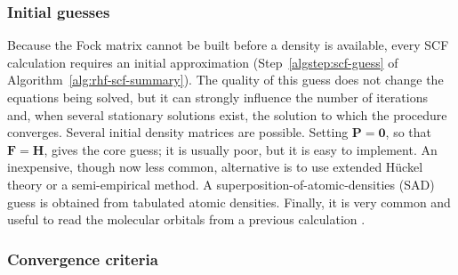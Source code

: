 \documentclass[11pt,a4paper,titlepage]{article}
\numberwithin{equation}{section}
\newcommand{\bF}{\boldsymbol{F}}
\newcommand{\bH}{\boldsymbol{H}}
\newcommand{\bO}{\boldsymbol{0}}
\newcommand{\bP}{\boldsymbol{P}}
\begin{document}
\subsubsection{Initial guesses}

Because the Fock matrix cannot be built before a density is available, every
SCF calculation requires an initial approximation
(Step~\ref{algstep:scf-guess} of Algorithm~\ref{alg:rhf-scf-summary}).
The quality of this guess
does not change the equations being solved, but it can strongly influence the
number of iterations and, when several stationary solutions exist, the
solution to which the procedure converges.
Several initial density matrices are possible. Setting $\bP=\bO$, so
that $\bF=\bH$, gives the core guess; it is usually poor, but it is
easy to implement. An inexpensive, though now less common, alternative is to
use extended H\"uckel theory or a semi-empirical method. A
superposition-of-atomic-densities (SAD) guess is obtained from
tabulated atomic densities. Finally, it is very common and useful to
read the molecular orbitals from a previous calculation \citep{Lehtola2019}.

\subsubsection{Convergence criteria}
\end{document}
